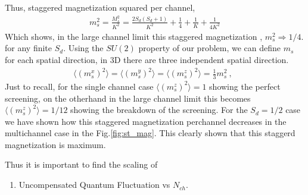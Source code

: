 \documentclass[reprint,prb,superscriptaddress]{revtex4-1}
\begin{document}
\noindent Thus, staggered magnetization squared per channel,
\begin{eqnarray}
m_s^2=\frac{M_s^2}{K^2}= \frac{2S_d(S_d+1)}{K^2}+\frac{1}{4}+\frac{1}{K}+\frac{1}{4K^2}
\end{eqnarray}
Which shows, in the large channel limit this staggered magnetization , $m^2_s\Rightarrow 1/4.$ for any finite $S_d$.
Using the $SU(2)$ property of our problem, we can define $m_s$ for each spatial direction, in 3D there are three independent spatial direction.
\begin{eqnarray}
\langle(m_s^x)^2\rangle=\langle(m_s^y)^2\rangle=\langle(m_s^z)^2\rangle=\frac{1}{3}m_s^2~,~~   
\end{eqnarray}
Just to recall, for the single channel case $\langle (m_s^z)^2 \rangle =1$ showing the perfect screening, on the otherhand in the large channel limit this becomes $\langle (m_s^z)^2 \rangle =1/12$ showing the breakdown of the screening. For the $S_d=1/2$ case we have shown how this staggered magnetization perchannel decreases in the multichannel case in the Fig.\ref{fig:st_mag}. This clearly shown that this staggerd magnetization is maximum.


%
%
%
%
%

Thus it is important to find the scaling of 

\begin{enumerate}
\item Uncompensated Quantum Fluctuation vs $N_{ch}$.
\end{enumerate}
\end{document}
